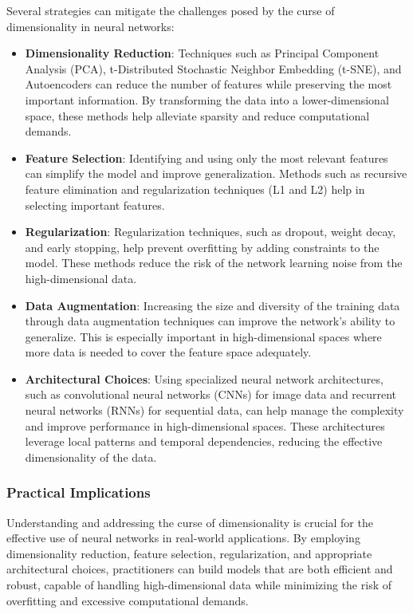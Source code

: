 \documentclass[11pt,a4paper]{article}
\begin{document}
Several strategies can mitigate the challenges posed by the curse of dimensionality in neural networks:
\begin{itemize}
    \item \textbf{Dimensionality Reduction}: Techniques such as Principal Component Analysis (PCA), t-Distributed Stochastic Neighbor Embedding (t-SNE), and Autoencoders can reduce the number of features while preserving the most important information. By transforming the data into a lower-dimensional space, these methods help alleviate sparsity and reduce computational demands.
  
    \item \textbf{Feature Selection}: Identifying and using only the most relevant features can simplify the model and improve generalization. Methods such as recursive feature elimination and regularization techniques (L1 and L2) help in selecting important features.
  
    \item \textbf{Regularization}: Regularization techniques, such as dropout, weight decay, and early stopping, help prevent overfitting by adding constraints to the model. These methods reduce the risk of the network learning noise from the high-dimensional data.
  
    \item \textbf{Data Augmentation}: Increasing the size and diversity of the training data through data augmentation techniques can improve the network's ability to generalize. This is especially important in high-dimensional spaces where more data is needed to cover the feature space adequately.
  
    \item \textbf{Architectural Choices}: Using specialized neural network architectures, such as convolutional neural networks (CNNs) for image data and recurrent neural networks (RNNs) for sequential data, can help manage the complexity and improve performance in high-dimensional spaces. These architectures leverage local patterns and temporal dependencies, reducing the effective dimensionality of the data.
\end{itemize}

\subsubsection{Practical Implications}

Understanding and addressing the curse of dimensionality is crucial for the effective use of neural networks in real-world applications. By employing dimensionality reduction, feature selection, regularization, and appropriate architectural choices, practitioners can build models that are both efficient and robust, capable of handling high-dimensional data while minimizing the risk of overfitting and excessive computational demands.
\end{document}
